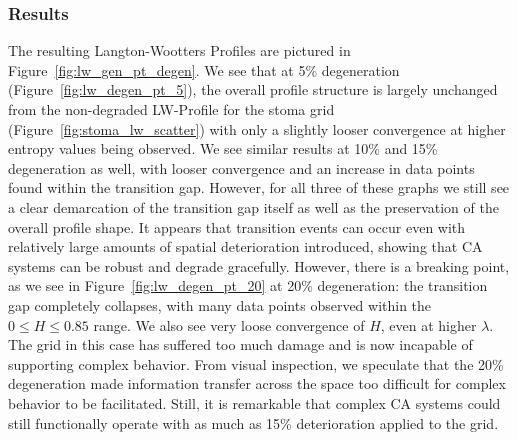 \documentclass[a4paper,11pt]{report}
\begin{document}
\subsubsection*{Results}

The resulting Langton-Wootters Profiles are pictured in Figure~\ref{fig:lw_gen_pt_degen}. We see that at 5\% degeneration (Figure~\ref{fig:lw_degen_pt_5}), the overall profile structure is largely unchanged from the non-degraded LW-Profile for the stoma grid (Figure~\ref{fig:stoma_lw_scatter}) with only a slightly looser convergence at higher entropy values being observed. We see similar results at 10\% and 15\% degeneration as well, with looser convergence and an increase in data points found within the transition gap. However, for all three of these graphs we still see a clear demarcation of the transition gap itself as well as the preservation of the overall profile shape. It appears that transition events can occur even with relatively large amounts of spatial deterioration introduced, showing that CA systems can be robust and degrade gracefully. However, there is a breaking point, as we see in Figure~\ref{fig:lw_degen_pt_20} at 20\% degeneration: the transition gap completely collapses, with many data points observed within the $0 \le H \le 0.85$ range. We also see very loose convergence of $H$, even at higher $\lambda$. The grid in this case has suffered too much damage and is now incapable of supporting complex behavior. From visual inspection, we speculate that the 20\% degeneration made information transfer across the space too difficult for complex behavior to be facilitated. Still, it is remarkable that complex CA systems could still functionally operate with as much as 15\% deterioration applied to the grid.
\end{document}
